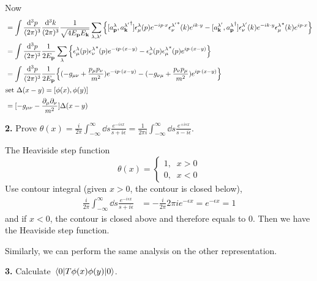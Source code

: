 \documentclass{article}
\newcommand{\vbp}{\vb{p}}
\newcommand{\vbk}{\vb{k}}
\newcommand{\la}{\lambda}
\begin{document}
Now
\begin{align*}
  [A_{\mu}(x),A_{\nu}(y)]&=\int\frac{\dd^3p}{(2\pi)^3}\frac{\dd^3k}{(2\pi)^3}\frac{1}{\sqrt{4E_{\vbp}E_{\vbk}}}\sum_{\la,\la'}\Bqty{[a^{\la}_{\vbp},{a^{\la'}_{\vbk}}^{\dagger}]\epsilon^{\la}_{\mu}(p)e^{-ip\cdot x}{\epsilon^{\la'}_{\nu}}^*(k)e^{ik\cdot y}-[a^{\la'}_{\vbk},{a^{\la}_{\vbp}}^{\dagger}]\epsilon^{\la'}_{\nu}(k)e^{-ik\cdot y}{\epsilon^{\la}_{\mu}}^*(k)e^{ip\cdot x}}\\
  &=\int\frac{\dd^3p}{(2\pi)^3}\frac{1}{2E_{\vbp}}\sum_{\la}\Bqty{\epsilon^{\la}_{\mu}(p){\epsilon^{\la}_{\nu}}^*(p)e^{-ip\cdot(x-y)}-\epsilon^{\la}_{\nu}(p){\epsilon^{\la}_{\mu}}^*(p)e^{ip\cdot{(x-y)}}}\\
  &=\int\frac{\dd^3p}{(2\pi)^3}\frac{1}{2E_{\vbp}}\Bqty{(-g_{\mu\nu}+\frac{p_{\mu}p_{\nu}}{m^2})e^{-ip\cdot(x-y)}-(-g_{\nu\mu}+\frac{p_{\nu}p_{\mu}}{m^2})e^{ip\cdot{(x-y)}}}\\
  \intertext{set $\Delta(x-y)=[\phi(x),\phi(y)]$}
  &=[-g_{\mu\nu}-\frac{\partial_{\mu}\partial_{\nu}}{m^2}]\Delta(x-y)
\end{align*}

{\bf2.}\quad
Prove $\displaystyle\theta(x)=\frac{i}{2\pi}\int_{-\infty}^{\infty}\dd s\frac{e^{-isx}}{s+i\epsilon}=\frac{1}{2\pi i}\int_{-\infty}^{\infty}\dd s\frac{e^{+isx}}{s-i\epsilon}$.

The Heaviside step function
$$\theta(x)=\begin{cases}
  1,\;\;x>0\\
  0,\;\;x<0
\end{cases}$$
Use contour integral (given $x>0$, the contour is closed below),
\begin{align*}
  \frac{i}{2\pi}\int_{-\infty}^{\infty}\dd s\frac{e^{-isx}}{s+i\epsilon}&=-\frac{i}{2\pi}2\pi ie^{-\epsilon x}=e^{-\epsilon x}=1
\end{align*}
and if  $x<0$, the contour is closed above and therefore equals to 0. Then we have the Heaviside step function.

Similarly, we can perform the same analysis on the other representation.

{\bf3.}\quad
Calculate $\mel{0}{T\phi(x)\phi(y)}{0}$.
\end{document}
